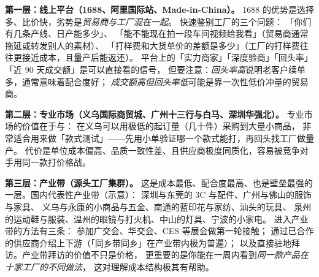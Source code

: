 \textbf{第一层：线上平台（1688、阿里国际站、Made-in-China）。}
1688 的优势是选择多、比价快，劣势是\emph{贸易商与工厂混在一起}。
快速鉴别工厂的三个问题：
「你们有几条产线、日产能多少」、
「能不能现在拍一段车间视频给我看」（贸易商通常拖延或转发别人的素材）、
「打样费和大货单价的差额是多少」（工厂的打样费往往更接近成本，且量产后能返还）。
平台上的「实力商家」「深度验商」「回头率」「近 90 天成交额」是可以直接看的信号，
但要注意：\emph{回头率高}说明老客户续单多，通常意味着配合度好；
\emph{成交额高但回头率低}可能是靠一次性低价冲量的贸易商。

\textbf{第二层：专业市场（义乌国际商贸城、广州十三行与白马、深圳华强北）。}
专业市场的价值在于与：
在义乌可以用极低的起订量（几十件）采购到大量小商品，
非常适合用来做「款式测试」——先用小单验证哪一个款式能打，再回头找工厂做量产。
代价是单位成本偏高、品质一致性差、且供应商极度同质化，容易被竞争对手用同一款打价格战。

\textbf{第三层：产业带（源头工厂集群）。}
这是成本最低、配合度最高、也是壁垒最强的一层。国内代表性产业带（示意）：
深圳与东莞的 3C 与配件、广州与佛山的服饰与家具、
义乌与永康的小商品与五金、南通的蓝印花与家纺、汕头的玩具、
泉州的运动鞋与服装、温州的眼镜与打火机、中山的灯具、宁波的小家电。
进入产业带的方法有三条：
参加广交会、华交会、CES 等展会做第一轮接触；
通过已合作的供应商介绍上下游（「同乡带同乡」在产业带内极为普遍）；
以及直接驻地拜访。产业带拜访的价值不只是价格，
更重要的是你能在一周内看到\emph{同一款产品在十家工厂的不同做法}，
这对理解成本结构极其有帮助。

